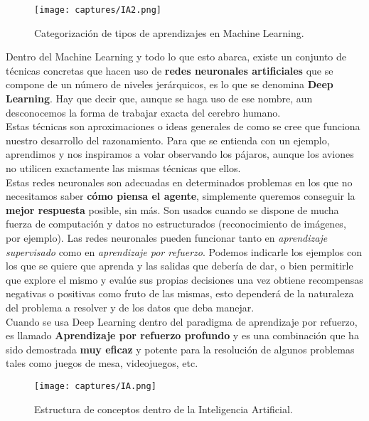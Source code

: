 \documentclass[11pt,fleqn]{book} %
\begin{document}
\begin{figure}[H]
	\centering\texttt{[image: captures/IA2.png]}
	\caption{Categorización de tipos de aprendizajes en Machine Learning.}
	\label{fig:IA2} %
\end{figure}

Dentro del Machine Learning y todo lo que esto abarca, existe un conjunto de técnicas concretas que hacen uso de \textbf{redes neuronales artificiales} que se compone de un número de niveles jerárquicos, es lo que se denomina \textbf{Deep Learning}. Hay que decir que, aunque se haga uso de ese nombre, aun desconocemos la forma de trabajar exacta del cerebro humano. \\

Estas técnicas son aproximaciones o ideas generales de como se cree que funciona nuestro desarrollo del razonamiento. Para que se entienda con un ejemplo, aprendimos y nos inspiramos a volar observando los pájaros, aunque los aviones no utilicen exactamente las mismas técnicas que ellos. \\

Estas redes neuronales son adecuadas en determinados problemas en los que no necesitamos saber \textbf{cómo piensa el agente}, simplemente queremos conseguir la \textbf{mejor respuesta} posible, sin más. Son usados cuando se dispone de mucha fuerza de computación y datos no estructurados (reconocimiento de imágenes, por ejemplo). Las redes neuronales pueden funcionar tanto en \textit{aprendizaje supervisado} como en \textit{aprendizaje por refuerzo}. Podemos indicarle los ejemplos con los que se quiere que aprenda y las salidas que debería de dar, o bien permitirle que explore el mismo y evalúe sus propias decisiones una vez obtiene recompensas negativas o positivas como fruto de las mismas, esto dependerá de la naturaleza del problema a resolver y de los datos que deba manejar.\cite{article:deeplearning}\\

Cuando se usa Deep Learning dentro del paradigma de aprendizaje por refuerzo, es llamado \textbf{Aprendizaje por refuerzo profundo} y es una combinación que ha sido demostrada \textbf{muy eficaz} y potente para la resolución de algunos problemas tales como juegos de mesa, videojuegos, etc. \\

\begin{figure}[H]
	\centering\texttt{[image: captures/IA.png]}
	\caption{Estructura de conceptos dentro de la Inteligencia Artificial.}
	\label{fig:IA} %
\end{figure}
\end{document}
